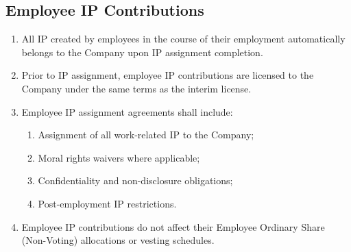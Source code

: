 \subsection{Employee IP Contributions}
\begin{enumerate}[label=(\alph*)]
\item All IP created by employees in the course of their employment automatically belongs to the Company upon IP assignment completion.

\item Prior to IP assignment, employee IP contributions are licensed to the Company under the same terms as the interim license.

\item Employee IP assignment agreements shall include:
    \begin{enumerate}[label=(\roman*)]
    \item Assignment of all work-related IP to the Company;
    \item Moral rights waivers where applicable;
    \item Confidentiality and non-disclosure obligations;
    \item Post-employment IP restrictions.
    \end{enumerate}

\item Employee IP contributions do not affect their Employee Ordinary Share (Non-Voting) allocations or vesting schedules.
\end{enumerate}

